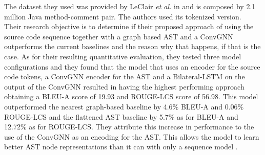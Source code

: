 The dataset they used was provided by LeClair \textit{et al.} in \cite{burstein2019proceedings} and 
is composed by 2.1 million Java method-comment pair. The authors used its tokenized version.\\
\newline
Their research objective is to determine if their proposed approach of using 
the source code sequence together with a graph based AST and a ConvGNN outperforms
the current baselines and the reason why that happens, if that is the case.
As for their resulting quantitative evaluation, they tested three model configurations and they found that the model 
that uses an encoder for the source code tokens, a ConvGNN encoder for the AST and a Bilateral-LSTM on the output 
of the ConvGNN resulted in having the highest performing approach obtaining a BLEU-A score of 19.93 
and ROUGE-LCS score of 56.98. This model outperformed the nearest graph-based baseline 
by 4.6\% BLEU-A and 0.06\% ROUGE-LCS and the flattened AST baseline by 5.7\% as for BLEU-A and 12.72\%
as for ROUGE-LCS. They attribute this increase in performance to the use of the 
ConvGNN as an encoding for the AST. This allows the model to learn better AST node representations than it can with 
only a sequence model \cite{Leclair2020}.

